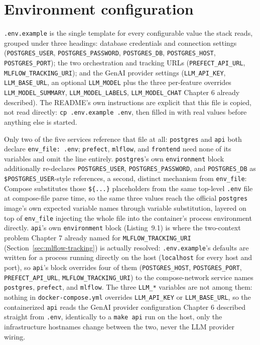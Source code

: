 \section{Environment configuration}
\label{sec:env-config}
\begin{sloppypar}
\texttt{.env.example} is the single template for every configurable value the stack reads, grouped under three headings: database credentials and connection settings (\texttt{POSTGRES\_USER}, \texttt{POSTGRES\_PASSWORD}, \texttt{POSTGRES\_DB}, \texttt{POSTGRES\_HOST}, \texttt{POSTGRES\_PORT}); the two orchestration and tracking URLs (\texttt{PREFECT\_API\_URL}, \texttt{MLFLOW\_TRACKING\_URI}); and the GenAI provider settings (\texttt{LLM\_API\_KEY}, \texttt{LLM\_BASE\_URL}, an optional \texttt{LLM\_MODEL} plus the three per-feature overrides \texttt{LLM\_MODEL\_SUMMARY}, \texttt{LLM\_MODEL\_LABELS}, \texttt{LLM\_MODEL\_CHAT} Chapter 6 already described). The README's own instructions are explicit that this file is copied, not read directly: \texttt{cp .env.example .env}, then filled in with real values before anything else is started.
\end{sloppypar}

\begin{sloppypar}
Only two of the five services reference that file at all: \texttt{postgres} and \texttt{api} both declare \texttt{env\_file: .env}; \texttt{prefect}, \texttt{mlflow}, and \texttt{frontend} need none of its variables and omit the line entirely. \texttt{postgres}'s own \texttt{environment} block additionally re-declares \texttt{POSTGRES\_USER}, \texttt{POSTGRES\_PASSWORD}, and \texttt{POSTGRES\_DB} as \texttt{\${POSTGRES\_USER}}-style references, a second, distinct mechanism from \texttt{env\_file}: Compose substitutes those \texttt{\$\{...\}} placeholders from the same top-level \texttt{.env} file at compose-file parse time, so the same three values reach the official \texttt{postgres} image's own expected variable names through variable substitution, layered on top of \texttt{env\_file} injecting the whole file into the container's process environment directly. \texttt{api}'s own \texttt{environment} block (Listing~9.1) is where the two-context problem Chapter 7 already named for \texttt{MLFLOW\_TRACKING\_URI} (Section~\ref{sec:mlflow-tracking}) is actually resolved: \texttt{.env.example}'s defaults are written for a process running directly on the host (\texttt{localhost} for every host and port), so \texttt{api}'s block overrides four of them (\texttt{POSTGRES\_HOST}, \texttt{POSTGRES\_PORT}, \texttt{PREFECT\_API\_URL}, \texttt{MLFLOW\_TRACKING\_URI}) to the compose-network service names \texttt{postgres}, \texttt{prefect}, and \texttt{mlflow}. The three \texttt{LLM\_*} variables are not among them: nothing in \texttt{docker-compose.yml} overrides \texttt{LLM\_API\_KEY} or \texttt{LLM\_BASE\_URL}, so the containerized \texttt{api} reads the GenAI provider configuration Chapter 6 described straight from \texttt{.env}, identically to a \texttt{make api} run on the host, only the infrastructure hostnames change between the two, never the LLM provider wiring.
\end{sloppypar}

